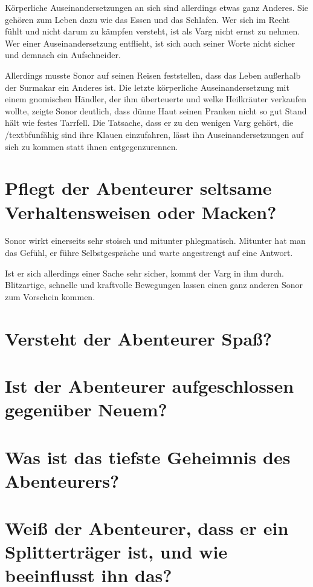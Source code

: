 \documentclass{article}
\begin{document}
	Körperliche Auseinandersetzungen an sich sind allerdings etwas ganz
	Anderes. Sie gehören zum Leben dazu wie das Essen und das Schlafen.
	Wer sich im Recht fühlt und nicht darum zu kämpfen versteht, ist als
	Varg nicht ernst zu nehmen. Wer einer Auseinandersetzung entflieht,
	ist sich auch seiner Worte nicht sicher und demnach ein Aufschneider.

	Allerdings musste Sonor auf seinen Reisen feststellen, dass das Leben
	außerhalb der Surmakar ein Anderes ist. Die letzte körperliche
	Auseinandersetzung mit einem gnomischen Händler, der ihm überteuerte
	und welke Heilkräuter verkaufen wollte, zeigte Sonor deutlich, dass
	dünne Haut seinen Pranken nicht so gut Stand hält wie festes Tarrfell.
	Die Tatsache, dass er zu den wenigen Varg gehört, die /textbf{unfähig}
	sind ihre Klauen einzufahren, lässt ihn Auseinandersetzungen auf sich zu
	kommen statt ihnen entgegenzurennen.


	\section[Macken]{Pflegt der Abenteurer seltsame Verhaltensweisen oder Macken?}



	
	Sonor wirkt einerseits sehr stoisch und mitunter phlegmatisch.
	Mitunter hat man das Gefühl, er führe Selbstgespräche und warte
	angestrengt auf eine Antwort.

	Ist er sich allerdings einer Sache sehr sicher, kommt der Varg in ihm
	durch. Blitzartige, schnelle und kraftvolle Bewegungen lassen einen ganz
	anderen Sonor zum Vorschein kommen.
	

	\section[Humor]{Versteht der Abenteurer Spaß?}
	




	\section[Aufgeschlossenheit]{Ist der Abenteurer aufgeschlossen gegenüber Neuem?}
	
	\section[Top Secret]{Was ist das tiefste Geheimnis des Abenteurers?}
	
	\section[Splitter]{Weiß der Abenteurer, dass er ein Splitterträger ist, und wie beeinflusst ihn das?}
\end{document}
